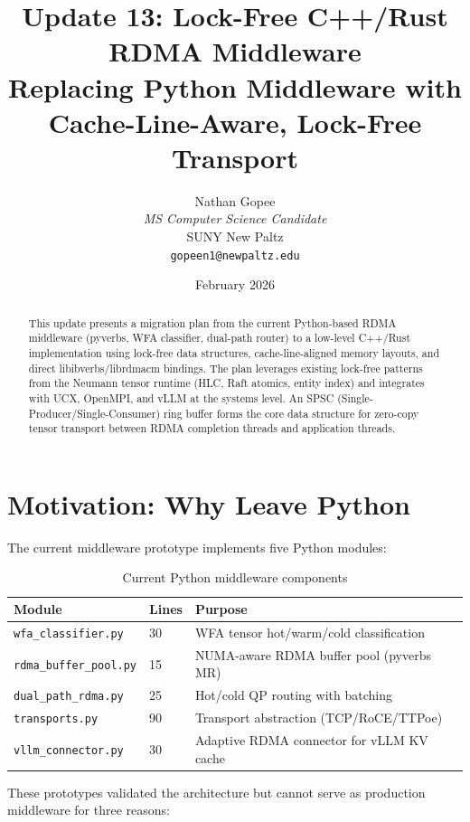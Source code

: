 \documentclass[11pt,letterpaper]{article}
\title{
    \vspace{-1cm}
    \textbf{Update 13: Lock-Free C++/Rust RDMA Middleware} \\[0.5em]
    \large Replacing Python Middleware with Cache-Line-Aware, Lock-Free Transport
}
\author{
    Nathan Gopee \\
    \textit{MS Computer Science Candidate} \\
    SUNY New Paltz \\
    \texttt{gopeen1@newpaltz.edu}
}
\date{February 2026}
\begin{document}
\maketitle

\begin{abstract}
\noindent
This update presents a migration plan from the current Python-based RDMA middleware (pyverbs, WFA classifier, dual-path router) to a low-level C++/Rust implementation using lock-free data structures, cache-line-aligned memory layouts, and direct libibverbs/librdmacm bindings. The plan leverages existing lock-free patterns from the Neumann tensor runtime (HLC, Raft atomics, entity index) and integrates with UCX, OpenMPI, and vLLM at the systems level. An SPSC (Single-Producer/Single-Consumer) ring buffer forms the core data structure for zero-copy tensor transport between RDMA completion threads and application threads.
\end{abstract}

\section{Motivation: Why Leave Python}

The current middleware prototype implements five Python modules:

\begin{table}[htbp]
\centering
\caption{Current Python middleware components}
\label{tab:python-middleware}
\begin{tabular}{@{}llp{7cm}@{}}
\toprule
\textbf{Module} & \textbf{Lines} & \textbf{Purpose} \\
\midrule
\texttt{wfa\_classifier.py} & 30 & WFA tensor hot/warm/cold classification \\
\texttt{rdma\_buffer\_pool.py} & 15 & NUMA-aware RDMA buffer pool (pyverbs MR) \\
\texttt{dual\_path\_rdma.py} & 25 & Hot/cold QP routing with batching \\
\texttt{transports.py} & 90 & Transport abstraction (TCP/RoCE/TTPoe) \\
\texttt{vllm\_connector.py} & 30 & Adaptive RDMA connector for vLLM KV cache \\
\bottomrule
\end{tabular}
\end{table}

These prototypes validated the architecture but cannot serve as production middleware for three reasons:
\end{document}

